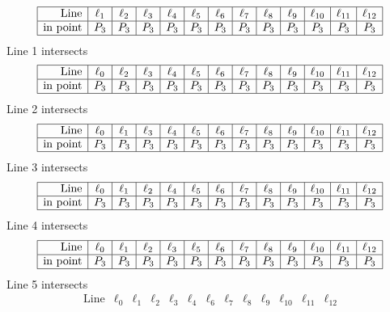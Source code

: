 \documentclass{article}
\begin{document}
{$$\begin{array}{|r*{12}{|c}|}
\hline
\mbox{Line}  & \ell_{1} & \ell_{2} & \ell_{3} & \ell_{4} & \ell_{5} & \ell_{6} & \ell_{7} & \ell_{8} & \ell_{9} & \ell_{10} & \ell_{11} & \ell_{12}\\
\hline
\mbox{in point}  & P_{3} & P_{3} & P_{3} & P_{3} & P_{3} & P_{3} & P_{3} & P_{3} & P_{3} & P_{3} & P_{3} & P_{3}\\
\hline
\end{array}
$$
Line 1 intersects 
$$
\begin{array}{|r*{12}{|c}|}
\hline
\mbox{Line}  & \ell_{0} & \ell_{2} & \ell_{3} & \ell_{4} & \ell_{5} & \ell_{6} & \ell_{7} & \ell_{8} & \ell_{9} & \ell_{10} & \ell_{11} & \ell_{12}\\
\hline
\mbox{in point}  & P_{3} & P_{3} & P_{3} & P_{3} & P_{3} & P_{3} & P_{3} & P_{3} & P_{3} & P_{3} & P_{3} & P_{3}\\
\hline
\end{array}
$$
Line 2 intersects 
$$
\begin{array}{|r*{12}{|c}|}
\hline
\mbox{Line}  & \ell_{0} & \ell_{1} & \ell_{3} & \ell_{4} & \ell_{5} & \ell_{6} & \ell_{7} & \ell_{8} & \ell_{9} & \ell_{10} & \ell_{11} & \ell_{12}\\
\hline
\mbox{in point}  & P_{3} & P_{3} & P_{3} & P_{3} & P_{3} & P_{3} & P_{3} & P_{3} & P_{3} & P_{3} & P_{3} & P_{3}\\
\hline
\end{array}
$$
Line 3 intersects 
$$
\begin{array}{|r*{12}{|c}|}
\hline
\mbox{Line}  & \ell_{0} & \ell_{1} & \ell_{2} & \ell_{4} & \ell_{5} & \ell_{6} & \ell_{7} & \ell_{8} & \ell_{9} & \ell_{10} & \ell_{11} & \ell_{12}\\
\hline
\mbox{in point}  & P_{3} & P_{3} & P_{3} & P_{3} & P_{3} & P_{3} & P_{3} & P_{3} & P_{3} & P_{3} & P_{3} & P_{3}\\
\hline
\end{array}
$$
Line 4 intersects 
$$
\begin{array}{|r*{12}{|c}|}
\hline
\mbox{Line}  & \ell_{0} & \ell_{1} & \ell_{2} & \ell_{3} & \ell_{5} & \ell_{6} & \ell_{7} & \ell_{8} & \ell_{9} & \ell_{10} & \ell_{11} & \ell_{12}\\
\hline
\mbox{in point}  & P_{3} & P_{3} & P_{3} & P_{3} & P_{3} & P_{3} & P_{3} & P_{3} & P_{3} & P_{3} & P_{3} & P_{3}\\
\hline
\end{array}
$$
Line 5 intersects 
$$
\begin{array}{|r*{12}{|c}|}
\hline
\mbox{Line}  & \ell_{0} & \ell_{1} & \ell_{2} & \ell_{3} & \ell_{4} & \ell_{6} & \ell_{7} & \ell_{8} & \ell_{9} & \ell_{10} & \ell_{11} & \ell_{12}\\

\end{array}$$}
\end{document}
